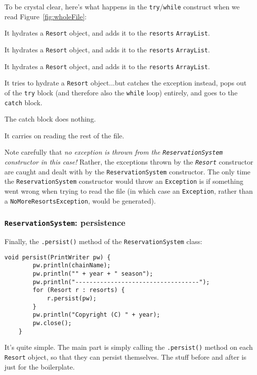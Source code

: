 To be crystal clear, here's what happens in the \texttt{try}/\texttt{while}
construct when we read Figure~\ref{fig:wholeFile}:

\begin{compactenum}
\item It hydrates a \texttt{Resort} object, and adds it to the
\texttt{resorts} \texttt{ArrayList}.
\item It hydrates a \texttt{Resort} object, and adds it to the
\texttt{resorts} \texttt{ArrayList}.
\item It hydrates a \texttt{Resort} object, and adds it to the
\texttt{resorts} \texttt{ArrayList}.
\item It tries to hydrate a \texttt{Resort} object...but catches the exception
instead, pops out of the \texttt{try} block (and therefore also the
\texttt{while} loop) entirely, and goes to the \texttt{catch} block.
\item The catch block does nothing.
\item It carries on reading the rest of the file.
\end{compactenum}

Note carefully that \textit{no exception is thrown from the
\texttt{ReservationSystem} constructor in this case!} Rather, the exceptions
thrown by the \textit{\texttt{Resort}} constructor are caught and dealt with
by the \texttt{ReservationSystem} constructor. The only time the
\texttt{ReservationSystem} constructor would throw an \texttt{Exception} is if
something went wrong when trying to read the file (in which case an
\texttt{Exception}, rather than a \texttt{NoMoreResortsException}, would be
generated).

\subsubsection{\texttt{ReservationSystem}: persistence}

Finally, the \texttt{.persist()} method of the \texttt{ReservationSystem}
class:

\begin{Verbatim}[fontsize=\small,samepage=true,frame=single]
    void persist(PrintWriter pw) {
        pw.println(chainName);
        pw.println("" + year + " season");
        pw.println("-----------------------------------");
        for (Resort r : resorts) {
            r.persist(pw);
        }
        pw.println("Copyright (C) " + year);
        pw.close();
    }
\end{Verbatim}

It's quite simple. The main part is simply calling the \texttt{.persist()}
method on each \texttt{Resort} object, so that they can persist themselves.
The stuff before and after is just for the boilerplate.

